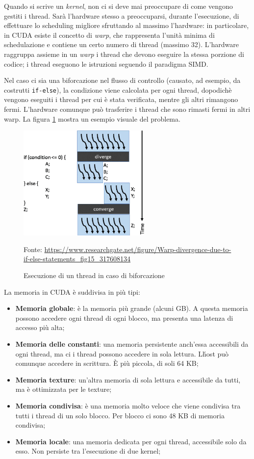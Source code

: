 \documentclass[12pt,a4paper,openright,twoside]{report}
\newcommand{\source}[1]{\vspace{-10pt} \caption*{\scriptsize Fonte: {#1}} }
\begin{document}
Quando si scrive un \textit{kernel}, non ci si deve mai preoccupare di come vengono gestiti i thread. Sarà l'hardware stesso a preoccuparsi, durante l'esecuzione, di effettuare lo scheduling migliore sfruttando al massimo l'hardware: in particolare, in CUDA esiste il concetto di \textit{warp}, che rappresenta l'unità minima di schedulazione e contiene un certo numero di thread (massimo 32). L'hardware raggruppa assieme in un \textit{warp} i thread che devono eseguire la stessa porzione di codice; i thread eseguono le istruzioni seguendo il paradigma SIMD.

Nel caso ci sia una biforcazione nel flusso di controllo (causato, ad esempio, da costrutti \verb|if-else|), la condizione viene calcolata per ogni thread, dopodichè vengono eseguiti i thread per cui è stata verificata, mentre gli altri rimangono fermi. L'hardware comunque può trasferire i thread che sono rimasti fermi in altri warp. La figura \ref{img:warp-branch} mostra un esempio visuale del problema.

\begin{figure}[h]
    \centering
    \includegraphics[width=6.5cm]{warp-branch.png}
    \caption{Esecuzione di un thread in caso di biforcazione}
    \source{\url{https://www.researchgate.net/figure/Warp-divergence-due-to-if-else-statements_fig15_317608134}}
    \label{img:warp-branch}
\end{figure}

La memoria in CUDA è suddivisa in più tipi:

\begin{itemize}
    \item \textbf{Memoria globale}: è la memoria più grande (alcuni GB). A questa memoria possono accedere ogni thread di ogni blocco, ma presenta una latenza di accesso più alta;
    \item \textbf{Memoria delle constanti}: una memoria persistente anch'essa accessibili da ogni thread, ma ci i thread possono accedere in sola lettura. L\'host può comunque accedere in scrittura. È più piccola, di soli 64 KB;
    \item \textbf{Memoria texture}: un'altra memoria di sola lettura e accessibile da tutti, ma è ottimizzata per le texture;
    \item \textbf{Memoria condivisa}: è una memoria molto veloce che viene condivisa tra tutti i thread di un solo blocco. Per blocco ci sono 48 KB di memoria condivisa;
    \item \textbf{Memoria locale}: una memoria dedicata per ogni thread, accessibile solo da esso. Non persiste tra l'esecuzione di due kernel;
\end{itemize}
\end{document}
